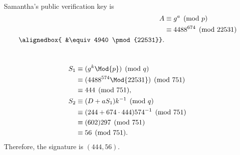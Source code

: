 \documentclass[
  coursecode={MTHE 418},
  assignmentname={Homework \homeworknumber},
  studentnumber=20053722,
  name={Bryan Hoang},
  draft,
]{
  ltxanswer%
}
\begin{document}
  \begin{questions}
    \setcounter{question}{\questionnumber}
    \addtocounter{question}{-1}
    \question[10]\
    \begin{parts}
      \part{}
      \begin{solution}
        Samantha's public verification key is
        \begin{align*}
          A            &\equiv g^{a} \pmod{p}          \\
                       &\equiv 4488^{674} \pmod{22531} \\
          \alignedbox{ &\equiv 4940 \pmod{22531}}.
        \end{align*}
      \end{solution}

      \part{}
      \begin{solution}
        \begin{align*}
          S_{1} &\equiv (g^{k} \Mod{p}) \pmod{q}                 \\
                &\equiv (4488^{574} \Mod{22531}) \pmod{751}      \\
                &\equiv 444 \pmod{751},                          \\
          S_{2} &\equiv (D + aS_{1}) k^{-1} \pmod{q}             \\
                &\equiv (244 + 674 \cdot 444)574^{-1} \pmod{751} \\
                &\equiv (602)297 \pmod{751}                      \\
                &\equiv 56 \pmod{751}.
        \end{align*}
        Therefore, the signature is \(\boxed{(444, 56)}\).
      \end{solution}
    \end{parts}
  \end{questions}
\end{document}
